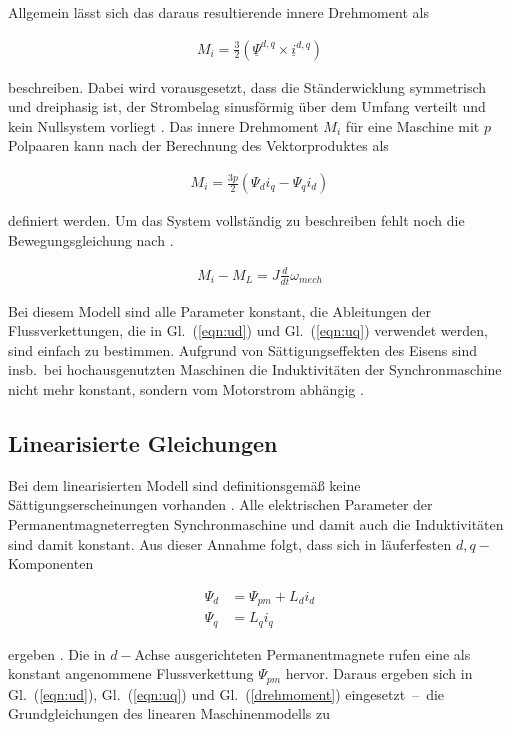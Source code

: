 \documentclass[conference,twocolumn]{IEEEtran}
\begin{document}
Allgemein lässt sich das daraus resultierende innere Drehmoment als

\begin{align}
M_i = \frac{3}{2} (\underline{\Psi}^{d,q} \times \underline{i}^{d,q}) \label{drehmoment}
\end{align}

beschreiben.
Dabei wird vorausgesetzt, dass die Ständerwicklung symmetrisch und dreiphasig ist, der Strombelag sinusförmig über dem Umfang verteilt und kein Nullsystem vorliegt \autocite{ternesfeldkamp}.
Das innere Drehmoment $M_i$ für eine Maschine mit $p$ Polpaaren kann nach der Berechnung des Vektorproduktes als

\begin{align}
M_i = \frac{3p}{2}(\Psi_d i_q - \Psi_q i_d)
\end{align}

definiert werden.
Um das System vollständig zu beschreiben fehlt noch die Bewegungsgleichung nach \textcite{mullerI2005}.

\begin{align}
M_i - M_L = J \frac{d}{dt} \omega_{mech} \label{bewegungsgleichung}
\end{align}

Bei diesem Modell sind alle Parameter konstant, die Ableitungen der Flussverkettungen, die in Gl.~(\ref{eqn:ud}) und Gl.~(\ref{eqn:uq}) verwendet werden, sind einfach zu bestimmen.
Aufgrund von Sättigungseffekten des Eisens sind insb.\ bei hochausgenutzten Maschinen die Induktivitäten der Synchronmaschine nicht mehr konstant, sondern vom Motorstrom abhängig \autocite{Kellner2012}.

\subsection{Linearisierte Gleichungen}\label{sec:lin-gleichungen}

Bei dem linearisierten Modell sind definitionsgemäß keine Sättigungserscheinungen vorhanden \autocite{mullerII2008}.
Alle elektrischen Parameter der Permanentmagneterregten Synchronmaschine und damit auch die Induktivitäten sind damit konstant.
Aus dieser Annahme folgt, dass sich in läuferfesten $d, q-$Komponenten

\begin{align}
\Psi_d &= \Psi_{pm} + L_d i_d \\
\Psi_q &= L_q i_q
\end{align}

ergeben \autocite{ternesfeldkamp}.
Die in $d-$Achse ausgerichteten Permanentmagnete rufen eine als konstant angenommene Flussverkettung $\Psi_{pm}$ hervor.
Daraus ergeben sich in Gl.~(\ref{eqn:ud}), Gl.~(\ref{eqn:uq}) und Gl.~(\ref{drehmoment}) eingesetzt~--~die Grundgleichungen des linearen Maschinenmodells zu
\end{document}
